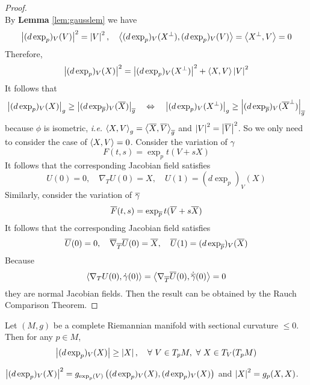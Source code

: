 \begin{enumerate}[label=\arabic{*}.]
\begin{proof}
\begin{equation*}
		\end{equation*}
		By \textbf{Lemma} \ref{lem:gausslem} we have
		\begin{equation*}
			\left\lvert(d\exp_p)_V(V)\right\lvert^2 = \left\lvert V\right\lvert^2,\quad \left\langle (d\exp_p)_V(X^\perp),(d\exp_p)_V(V) \right\rangle = \left\langle X^\perp,V \right\rangle = 0
		\end{equation*}
		Therefore,
		\begin{equation*}
			\left\lvert(d\exp_p)_V(X)\right\lvert^2 = \left\lvert(d\exp_p)_V(X^\perp)\right\lvert^2 + \left\langle X,V \right\rangle\left\lvert V\right\lvert^2
		\end{equation*}
		It follows that
		\begin{equation*}
			\left\lvert(d\exp_p)_V(X)\right\lvert_g \geq \left\lvert(d\exp_{\overline{p}})_V(\overline{X})\right\lvert_{\overline{g}} \quad\Leftrightarrow\quad \left\lvert(d\exp_p)_V(X^\perp)\right\lvert_g \geq \left\lvert(d\exp_{\overline{p}})_V(\overline{X}^\perp)\right\lvert_{\overline{g}}
		\end{equation*}
		because $\phi$ is isometric, \emph{i.e.} $\left\langle X,V \right\rangle_{g} =\left\langle \overline{X},\overline{V} \right\rangle_{\overline{g}}$ and $\left\lvert V\right\lvert^2 = \left\lvert\overline{V}\right\lvert^2$. So we only need to consider the case of $\left\langle X,V \right\rangle = 0$. Consider the variation of $\gamma$
		\begin{equation*}
			F(t,s) = \exp_pt(V+sX)
		\end{equation*}
		It follows that the corresponding Jacobian field satisfies
		\begin{equation*}
			U(0) = 0,\quad \nabla_TU(0) = X,\quad U(1) = (d\exp_p)_V(X)
		\end{equation*}
		Similarly, consider the variation of $\overline{\gamma}$
		\begin{equation*}
			\overline{F}(t,s) = \exp_{\overline{p}}t(\overline{V}+s\overline{X})
		\end{equation*}
		It follows that the corresponding Jacobian field satisfies
		\begin{equation*}
			\overline{U}(0) = 0,\quad \overline{\nabla}_{\overline{T}}\overline{U}(0) = \overline{X},\quad \overline{U}(1) = (d\exp_{\overline{p}})_V(\overline{X})
		\end{equation*}
		Because
		\begin{equation*}
			\left\langle \nabla_TU(0),\dot{\gamma}(0) \right\rangle = \left\langle \nabla_{\overline{T}}\overline{U}(0),\dot{\overline{\gamma}}(0) \right\rangle = 0
		\end{equation*}
		they are normal Jacobian fields. Then the result can be obtained by the Rauch Comparison Theorem.
	\end{proof}
	\begin{cor}
		Let $(M,g)$ be a complete Riemannian manifold with sectional curvature $\leq 0$. Then for any $p \in M$,
		\begin{equation*}
			\left\lvert(d\exp_p)_V(X)\right\lvert \geq \left\lvert X\right\lvert,\quad \forall~V \in T_pM,~\forall~X \in T_V(T_pM)
		\end{equation*}
	\end{cor}
	\begin{rmk}
		$\left\lvert(d\exp_p)_V(X)\right\lvert^2 = g_{\exp_p(V)}\left((d\exp_p)_V(X),(d\exp_p)_V(X)\right)$ and $\left\lvert X\right\lvert^2 = g_p(X,X)$.
	\end{rmk}


\end{enumerate}
